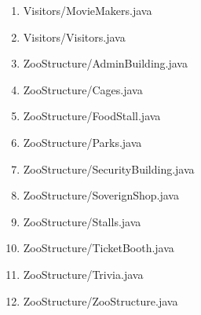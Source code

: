 \documentclass[paper=a4, fontsize=11pt]{scrartcl} %
\numberwithin{equation}{section} %
\numberwithin{figure}{section} %
\numberwithin{table}{section} %
\begin{document}
\begin{enumerate}
	\item Visitors/MovieMakers.java
	\item Visitors/Visitors.java
	\item ZooStructure/AdminBuilding.java
	\item ZooStructure/Cages.java
	\item ZooStructure/FoodStall.java
	\item ZooStructure/Parks.java
	\item ZooStructure/SecurityBuilding.java
	\item ZooStructure/SoverignShop.java
	\item ZooStructure/Stalls.java
	\item ZooStructure/TicketBooth.java
	\item ZooStructure/Trivia.java
	\item ZooStructure/ZooStructure.java
\end{enumerate}
\end{document}
